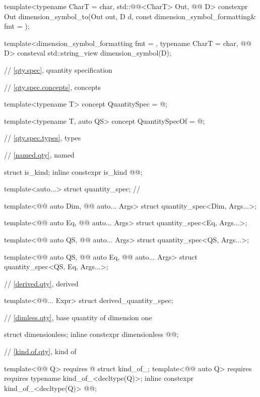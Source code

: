 \begin{codeblock}
{template<typename CharT = char, std::@@<CharT> Out, @@ D>
constexpr Out dimension_symbol_to(Out out, D d, const dimension_symbol_formatting& fmt = {});

template<dimension_symbol_formatting fmt = {}, typename CharT = char, @@ D>
consteval std::string_view dimension_symbol(D);

// \ref{qty.spec}, quantity specification

// \ref{qty.spec.concepts}, concepts

template<typename T>
concept QuantitySpec = @\seebelownc@;

template<typename T, auto QS>
concept QuantitySpecOf = @\seebelownc@;

// \ref{qty.spec.types}, types

// \ref{named.qty}, named

struct is_kind;
inline constexpr is_kind @@{};

template<auto...>
struct quantity_spec;  // \notdef

template<@@ auto Dim, @@ auto... Args>
struct quantity_spec<Dim, Args...>;

template<@@ auto Eq, @@ auto... Args>
struct quantity_spec<Eq, Args...>;

template<@@ auto QS, @@ auto... Args>
struct quantity_spec<QS, Args...>;

template<@@ auto QS, @@ auto Eq, @@ auto... Args>
struct quantity_spec<QS, Eq, Args...>;

// \ref{derived.qty}, derived

template<@@... Expr>
struct derived_quantity_spec;

// \ref{dimless.qty}, base quantity of dimension one

struct dimensionless;
inline constexpr dimensionless @@{};

// \ref{kind.of.qty}, kind of

template<@@ Q>
  requires @\seebelownc@
struct kind_of_;
template<@@ auto Q>
  requires requires { typename kind_of_<decltype(Q)>; }
inline constexpr kind_of_<decltype(Q)> @@{};

}
\end{codeblock}
